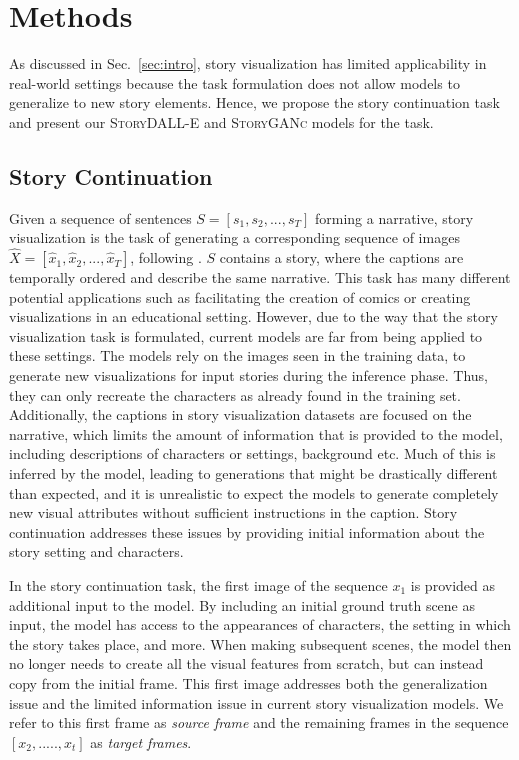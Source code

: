 \documentclass[runningheads]{llncs}
\newcommand{\sdalle}[1]{\textsc{StoryDALL-E}}
\newcommand{\sgan}[1]{\textsc{StoryGANc}}
\begin{document}
\section{Methods} \label{sec:modeling}
As discussed in Sec.~\ref{sec:intro}, story visualization has limited applicability in real-world settings because the task formulation does not allow models to generalize to new story elements. Hence, we propose the story continuation task and present our \sdalle{} and \sgan{} models for the task.

\subsection{Story Continuation}
Given a sequence of sentences $S=[s_1, s_2, ..., s_T]$ forming a narrative, story visualization is the task of generating a corresponding sequence of images $\hat{X} = [\hat{x}_1, \hat{x}_2, ..., \hat{x}_T]$, following \cite{li2019storygan}. $S$ contains a story, where the captions are temporally ordered and describe the same narrative. This task has many different potential applications such as facilitating the creation of comics or creating visualizations in an educational setting. However, due to the way that the story visualization task is formulated, current models are far from being applied to these settings. The models rely on the images seen in the training data, to generate new visualizations for input stories during the inference phase. Thus, they can only recreate the characters as already found in the training set. Additionally, the captions in story visualization datasets are focused on the narrative, which limits the amount of information that is provided to the model, including descriptions of characters or settings, background etc. Much of this is inferred by the model, leading to generations that might be drastically different than expected, and it is unrealistic to expect the models to generate completely new visual attributes without sufficient instructions in the caption. Story continuation addresses these issues by providing initial information about the story setting and characters.

In the story continuation task, the first image of the sequence $x_1$ is provided as additional input to the model. By including an initial ground truth scene as input, the model has access to the appearances of characters, the setting in which the story takes place, and more. When making subsequent scenes, the model then no longer needs to create all the visual features from scratch, but can instead copy from the initial frame. This first image addresses both the generalization issue and the limited information issue in current story visualization models. We refer to this first frame as \textit{source frame} and the remaining frames in the sequence $[x_2, ....., x_t]$ as \textit{target frames}.
\end{document}
